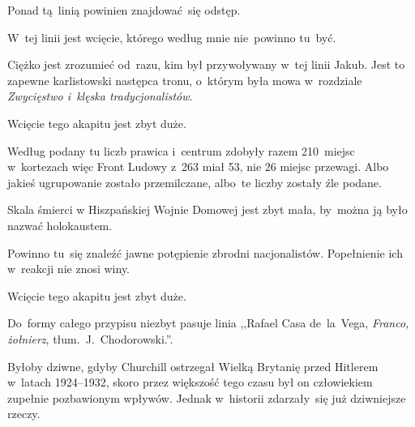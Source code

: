 \documentclass[a4paper,11pt]{article}
\begin{document}
\start {} Ponad tą~linią powinien znajdować~się odstęp.

\vspace{\spaceFour}


\start {} W~tej linii jest wcięcie, którego według mnie
nie~powinno tu~być.

\vspace{\spaceFour}


\start {} Ciężko jest zrozumieć od~razu, kim był
przywoływany w~tej linii Jakub. Jest to zapewne karlistowski następca
tronu, o~którym była mowa w~rozdziale \emph{Zwycięstwo i~klęska
  tradycjonalistów}. 

\vspace{\spaceFour}


\start {} Wcięcie tego akapitu jest zbyt duże.

\vspace{\spaceFour}


\start {} Według podany tu liczb prawica i~centrum zdobyły
razem 210~miejsc w~kortezach więc Front Ludowy z~263 miał 53, nie 26
miejsc przewagi. Albo jakieś ugrupowanie zostało przemilczane, albo~te
liczby zostały źle podane.

\vspace{\spaceFour}


\start {} Skala śmierci w Hiszpańskiej Wojnie Domowej jest
zbyt mała, by~można ją było nazwać holokaustem.

\vspace{\spaceFour}


\start {} Powinno tu~się znaleźć jawne potępienie zbrodni
nacjonalistów. Popełnienie ich w~reakcji nie znosi winy.

\vspace{\spaceFour}


\start {} Wcięcie tego akapitu jest zbyt duże.

\vspace{\spaceFour}


\start {} Do~formy całego przypisu niezbyt pasuje linia
,,Rafael Casa de~la~Vega, \emph{Franco, żołnierz},
tłum.~J.~Chodorowski.''.

\vspace{\spaceFour}


\start {} Byłoby dziwne, gdyby Churchill ostrzegał Wielką
Brytanię przed Hitlerem w~latach 1924--1932, skoro przez większość
tego czasu był on człowiekiem zupełnie pozbawionym wpływów. Jednak
w~historii zdarzały~się już dziwniejsze rzeczy.
\end{document}
